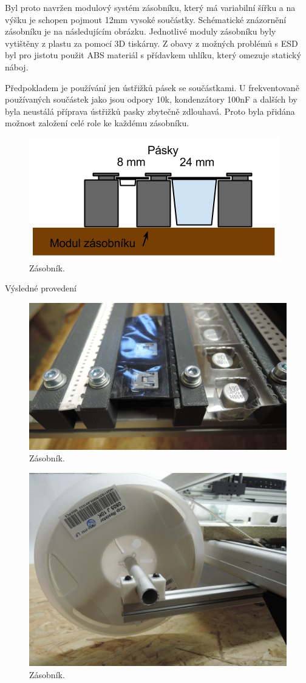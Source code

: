 Byl proto navržen modulový systém zásobníku, který má variabilní šířku a na výšku je schopen pojmout 12mm vysoké součástky. Schématické znázornění zásobníku je na následujícím obrázku. Jednotlivé moduly zásobníku byly vytištěny z plastu za pomocí 3D tiskárny. Z obavy z možných problémů s ESD byl pro jistotu použit ABS materiál s přídavkem uhlíku, který omezuje statický náboj.

Předpokladem je používání jen ústřižků pásek se součástkami. U frekventovaně používaných součástek jako jsou odpory 10k, kondenzátory 100nF a dalších by byla neustálá příprava ústřižků pasky zbytečně zdlouhavá. Proto byla přidána možnost založení celé role ke každému zásobníku.  

\begin{figure}[h!]
  \centering
    \includegraphics{obrazky/zasobnik.png}%
    \caption{Zásobník.}
    \label{fig:zasobnik}
\end{figure}



Výsledné provedení 
\begin{figure}[h!]
  \centering
    \includegraphics[width=0.85\linewidth]{obrazky/zasobniky.jpg}%
    \caption{Zásobník.}
    \label{fig:zasobniky}
\end{figure}

\begin{figure}[h!]
  \centering
    \includegraphics[width=0.85\linewidth]{obrazky/role.jpg}%
    \caption{Zásobník.}
    \label{fig:role}
\end{figure}

